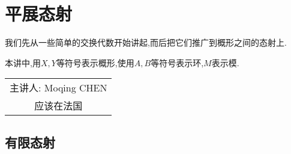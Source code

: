 \chapter{平展态射}
我们先从一些简单的交换代数开始讲起,而后把它们推广到概形之间的态射上.
\begin{convention}
    本讲中,用$X,Y$等符号表示概形,使用$A,B$等符号表示环,$M$表示模.
\end{convention}
\begin{flushright}\begin{minipage}{0.3 \textwidth}
	\begin{tabular}{c}
		{主讲人: Moqing CHEN} \\
		应该在法国
	\end{tabular}
\end{minipage}\end{flushright}
\section{有限态射}

